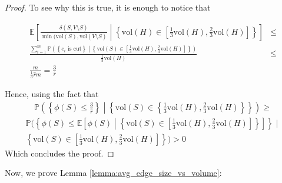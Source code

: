 \documentclass[../main.tex]{subfiles}
\begin{document}
\begin{proof}
    To see why this is true, it is enough to notice that
    
    \begin{align}
        \mathbb{E}\left[\frac{\delta(S, V\setminus S)}{\min(\text{vol}(S), \text{vol}(V\setminus S)} \middle| \left\{\text{vol}(H)\in\left[\frac{1}{3}\text{vol}(H), \frac{2}{3}\text{vol}(H)\right]\right\} \right] & \leq \\
        \frac{\sum_{i=1}^{m} \mathbb{P}\left(\left\{e_i \text{ is cut}\right\} \middle| \left\{\text{vol}(S)\in\left[\frac{1}{3}\text{vol}(H), \frac{2}{3}\text{vol}(H)\right]\right\}\right)}{\frac{1}{3}\text{vol}(H)} & \leq \\ 
        \frac{m}{\frac{1}{3}\hat{r}m} = \frac{3}{\hat{r}}
    \end{align}
    
    Hence, using the fact that 
    \begin{align}
        \mathbb{P}\left(\left\{\phi(S)\leq\frac{3}{\hat{r}}\right\}\middle|\left\{\text{vol}(S)\in\left\{\frac{1}{3}\text{vol}(H), \frac{2}{3}\text{vol}(H)\right\}\right\}\right) \geq
    \end{align}
    \begin{multline}
        \mathbb{P}\biggl(\left\{\phi(S)\leq \mathbb{E}\left[\phi(S)\middle|\left\{\text{vol}(S)\in\left[\frac{1}{3}\text{vol}(H), \frac{2}{3}\text{vol}(H)\right]\right\}\right]\right\} \mid \\ \left\{\text{vol}(S)\in\left[\frac{1}{3}\text{vol}(H), \frac{2}{3}\text{vol}(H)\right]\right\}\biggr) > 0
    \end{multline}
    Which concludes the proof.
\end{proof}

Now, we prove Lemma \ref{lemma:avg_edge_size_vs_volume}:
\end{document}
